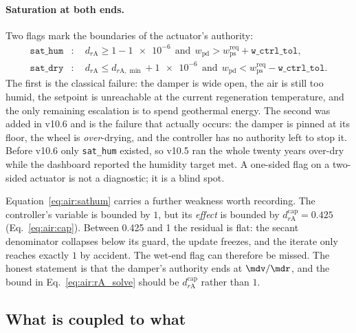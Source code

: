 \paragraph{Saturation at both ends.} Two flags mark the boundaries of the
actuator's authority:
\begin{align}
\texttt{sat\_hum} &:\quad d_{r\mathrm{A}} \ge 1-\num{1e-6}
   \ \ \text{and}\ \ w_{\mathrm{pd}} > w_{\mathrm{ps}}^{\mathrm{req}}
   + \texttt{w\_ctrl\_tol},
\label{eq:air:sathum}\\
\texttt{sat\_dry} &:\quad d_{r\mathrm{A}} \le d_{r\mathrm{A},\min}+\num{1e-6}
   \ \ \text{and}\ \ w_{\mathrm{pd}} < w_{\mathrm{ps}}^{\mathrm{req}}
   - \texttt{w\_ctrl\_tol}.
\label{eq:air:satdry}
\end{align}
The first is the classical failure: the damper is wide open, the air is still
too humid, the setpoint is unreachable at the current regeneration temperature,
and the only remaining escalation is to spend geothermal energy. The second was
added in v10.6 and is the failure that actually occurs: the damper is pinned at
its floor, the wheel is \emph{over}-drying, and the controller has no authority
left to stop it. Before v10.6 only \texttt{sat\_hum} existed, so v10.5 ran the
whole twenty years over-dry while the dashboard reported the humidity target
met. A one-sided flag on a two-sided actuator is not a diagnostic; it is a
blind spot.

Equation~\eqref{eq:air:sathum} carries a further weakness worth recording. The
controller's variable is bounded by $1$, but its \emph{effect} is bounded by
$d_{r\mathrm{A}}^{\mathrm{cap}}=\num{0.425}$ (Eq.~\eqref{eq:air:cap}). Between
\num{0.425} and \num{1} the residual is flat: the secant denominator collapses
below its guard, the update freezes, and the iterate only reaches exactly $1$
by accident. The wet-end flag can therefore be missed. The honest statement is
that the damper's authority ends at $\mdv/\mdr$, and the bound in
Eq.~\eqref{eq:air:rA_solve} should be $d_{r\mathrm{A}}^{\mathrm{cap}}$ rather
than $1$.

\subsection{What is coupled to what}
\label{sec:air:coupling}

